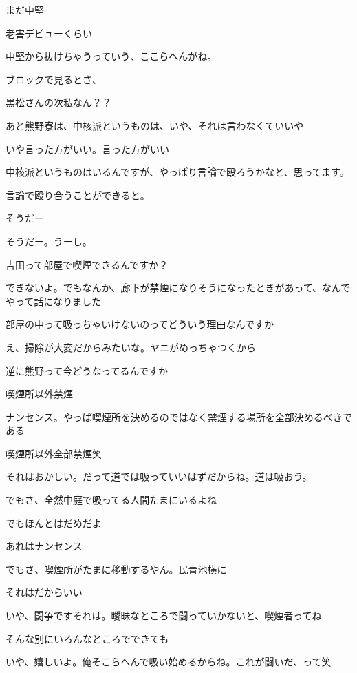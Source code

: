 \begin{multicols}{3}
まだ中堅

老害デビューくらい

中堅から抜けちゃうっていう、ここらへんがね。

ブロックで見るとさ、

黒松さんの次私なん？？

あと熊野寮は、中核派というものは、いや、それは言わなくていいや

いや言った方がいい。言った方がいい

中核派というものはいるんですが、やっぱり言論で殴ろうかなと、思ってます。

言論で殴り合うことができると。

そうだー

そうだー。うーし。

吉田って部屋で喫煙できるんですか？

できないよ。でもなんか、廊下が禁煙になりそうになったときがあって、なんでやって話になりました

部屋の中って吸っちゃいけないのってどういう理由なんですか

え、掃除が大変だからみたいな。ヤニがめっちゃつくから

逆に熊野って今どうなってるんですか

喫煙所以外禁煙

ナンセンス。やっぱ喫煙所を決めるのではなく禁煙する場所を全部決めるべきである

喫煙所以外全部禁煙笑

それはおかしい。だって道では吸っていいはずだからね。道は吸おう。

でもさ、全然中庭で吸ってる人間たまにいるよね

でもほんとはだめだよ

あれはナンセンス

でもさ、喫煙所がたまに移動するやん。民青池横に

それはだからいい

いや、闘争ですそれは。曖昧なところで闘っていかないと、喫煙者ってね

そんな別にいろんなところでできても

いや、嬉しいよ。俺そこらへんで吸い始めるからね。これが闘いだ、って笑


\end{multicols}
